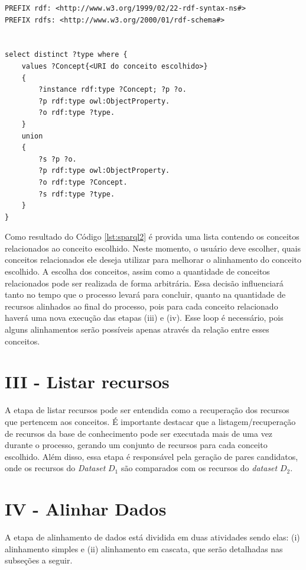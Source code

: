 \begin{lstlisting}[captionpos=b, caption=Query SPARQL para recuperação de conceitos relacionados, label=lst:sparql2,
   basicstyle=\ttfamily,frame=single]
PREFIX rdf: <http://www.w3.org/1999/02/22-rdf-syntax-ns#>
PREFIX rdfs: <http://www.w3.org/2000/01/rdf-schema#>


select distinct ?type where {
	values ?Concept{<URI do conceito escolhido>}
	{
		?instance rdf:type ?Concept; ?p ?o.
		?p rdf:type owl:ObjectProperty.
		?o rdf:type ?type.
	}
	union
	{
		?s ?p ?o.
		?p rdf:type owl:ObjectProperty.
		?o rdf:type ?Concept.
		?s rdf:type ?type.
	}
}

\end{lstlisting}

Como resultado do Código \ref{lst:sparql2} é provida uma lista contendo os conceitos relacionados ao conceito escolhido. Neste momento, o usuário deve escolher, quais conceitos relacionados ele deseja utilizar para melhorar o alinhamento do conceito escolhido. A escolha dos conceitos, assim como a quantidade de conceitos relacionados pode ser realizada de forma arbitrária. Essa decisão influenciará tanto no tempo que o processo levará para concluir, quanto na quantidade de recursos alinhados ao final do processo, pois para cada conceito relacionado haverá uma nova execução das etapas (iii) e (iv). Esse loop é necessário, pois alguns alinhamentos serão possíveis apenas através da relação entre esses conceitos.

\section{III - Listar recursos}
A etapa de listar recursos pode ser entendida como a recuperação dos recursos que pertencem aos conceitos. É importante destacar que a listagem/recuperação de recursos da base de conhecimento pode ser executada mais de uma vez durante o processo, gerando um conjunto de recursos para cada conceito escolhido. Além disso, essa etapa é responsável pela geração de pares candidatos, onde os recursos do \textit{Dataset} $D_{1}$ são comparados com os recursos do \textit{dataset} $D_{2}$.


\section{IV - Alinhar Dados}
A etapa de alinhamento de dados está dividida em duas atividades sendo elas: (i) alinhamento simples e (ii) alinhamento em cascata, que serão detalhadas nas subseções a seguir.

